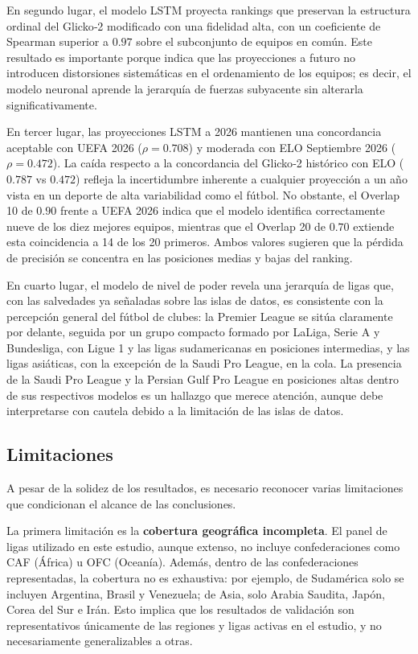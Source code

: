 En segundo lugar, el modelo LSTM proyecta rankings que preservan la estructura ordinal del Glicko‑2 modificado con una fidelidad alta, con un coeficiente de Spearman superior a $0{.}97$ sobre el subconjunto de equipos en com\'un. Este resultado es importante porque indica que las proyecciones a futuro no introducen distorsiones sistem\'aticas en el ordenamiento de los equipos; es decir, el modelo neuronal aprende la jerarqu\'ia de fuerzas subyacente sin alterarla significativamente.

En tercer lugar, las proyecciones LSTM a 2026 mantienen una concordancia aceptable con UEFA 2026 ($\rho = 0.708$) y moderada con ELO Septiembre 2026 ($\rho = 0.472$). La ca\'ida respecto a la concordancia del Glicko‑2 hist\'orico con ELO ($0.787$ vs $0.472$) refleja la incertidumbre inherente a cualquier proyecci\'on a un a\~no vista en un deporte de alta variabilidad como el f\'utbol. No obstante, el Overlap 10 de $0.90$ frente a UEFA 2026 indica que el modelo identifica correctamente nueve de los diez mejores equipos, mientras que el Overlap 20 de $0.70$ extiende esta coincidencia a 14 de los 20 primeros. Ambos valores sugieren que la p\'erdida de precisi\'on se concentra en las posiciones medias y bajas del ranking.

En cuarto lugar, el modelo de nivel de poder revela una jerarqu\'ia de ligas que, con las salvedades ya se\~naladas sobre las islas de datos, es consistente con la percepci\'on general del f\'utbol de clubes: la Premier League se sit\'ua claramente por delante, seguida por un grupo compacto formado por LaLiga, Serie A y Bundesliga, con Ligue 1 y las ligas sudamericanas en posiciones intermedias, y las ligas asi\'aticas, con la excepci\'on de la Saudi Pro League, en la cola. La presencia de la Saudi Pro League y la Persian Gulf Pro League en posiciones altas dentro de sus respectivos modelos es un hallazgo que merece atenci\'on, aunque debe interpretarse con cautela debido a la limitaci\'on de las islas de datos.

\subsection{Limitaciones}

A pesar de la solidez de los resultados, es necesario reconocer varias limitaciones que condicionan el alcance de las conclusiones.

La primera limitaci\'on es la \textbf{cobertura geogr\'afica incompleta}. El panel de ligas utilizado en este estudio, aunque extenso, no incluye confederaciones como CAF (\'Africa) u OFC (Ocean\'ia). Adem\'as, dentro de las confederaciones representadas, la cobertura no es exhaustiva: por ejemplo, de Sudam\'erica solo se incluyen Argentina, Brasil y Venezuela; de Asia, solo Arabia Saudita, Jap\'on, Corea del Sur e Ir\'an. Esto implica que los resultados de validaci\'on son representativos \'unicamente de las regiones y ligas activas en el estudio, y no necesariamente generalizables a otras.

